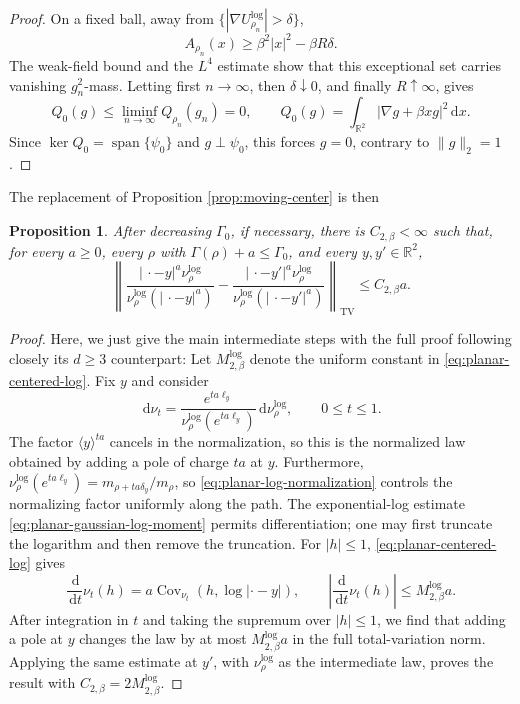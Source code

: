 \documentclass[12pt,reqno,letterpaper]{amsart}
\newtheorem{proposition}[theorem]{Proposition}
\theoremstyle{definition}
\theoremstyle{remark}
\numberwithin{equation}{section}
\newcommand{\R}{\mathbb R}
\newcommand{\dd}{\,\mathrm d}
\newcommand{\be}{\beta}
\newcommand{\TV}{\mathrm{TV}}
\begin{document}
\begin{appendix}
\begin{proof}
On a fixed ball, away from
\(\{|\nabla U_{\rho_n}^{\log}|>\delta\}\),
\[
 A_{\rho_n}(x)
 \ge\be^2|x|^2-\be R\delta.
\]
The weak-field bound and the \(L^4\) estimate show that this exceptional set
carries vanishing \(g_n^2\)-mass.  Letting first \(n\to\infty\), then
\(\delta\downarrow0\), and finally \(R\uparrow\infty\), gives
\[
 Q_0(g)\le\liminf_{n\to\infty}Q_{\rho_n}(g_n)=0,
 \qquad
 Q_0(g)=\int_{\R^2}|\nabla g+\be xg|^2\dd x.
\]
Since \(\ker Q_0=\operatorname{span}\{\psi_0\}\) and
\(g\perp\psi_0\), this forces \(g=0\), contrary to \(\|g\|_2=1\).
\end{proof}
The replacement of Proposition \ref{prop:moving-center} is then
\begin{proposition}
\label{prop:planar-moving-center}
After decreasing \(\Gamma_0\), if necessary, there is
\(C_{2,\be}<\infty\) such that, for every \(a\ge0\), every \(\rho\) with
\(\Gamma(\rho)+a\le\Gamma_0\), and every \(y,y'\in\R^2\),
\begin{equation}\label{eq:planar-moving-input}
 \left\|
 \frac{|\,\cdot-y|^a\nu_\rho^{\log}}
      {\nu_\rho^{\log}(|\,\cdot-y|^a)}
 -
 \frac{|\,\cdot-y'|^a\nu_\rho^{\log}}
      {\nu_\rho^{\log}(|\,\cdot-y'|^a)}
 \right\|_{\TV}
 \le C_{2,\be}a.
\end{equation}
\end{proposition}

\begin{proof}
Here, we just give the main intermediate steps with the full proof following closely its $d\ge 3$ counterpart:
Let \(M_{2,\be}^{\log}\) denote the uniform constant in
\eqref{eq:planar-centered-log}.  Fix \(y\) and consider
\[
 \dd\nu_t
 =\frac{e^{ta\ell_y}}{\nu_\rho^{\log}(e^{ta\ell_y})}
 \dd\nu_\rho^{\log},
 \qquad 0\le t\le1.
\]
The factor \(\langle y\rangle^{ta}\) cancels in the normalization, so this is
the normalized law obtained by adding a pole of charge \(ta\) at \(y\).
Furthermore,
\(\nu_\rho^{\log}(e^{ta\ell_y})
=m_{\rho+ta\delta_y}/m_\rho\), so
\eqref{eq:planar-log-normalization} controls the normalizing factor uniformly
along the path.  The exponential-log estimate
\eqref{eq:planar-gaussian-log-moment} permits differentiation; one may first
truncate the logarithm and then remove the truncation.  For \(|h|\le1\),
\eqref{eq:planar-centered-log} gives
\[
 \frac{\dd}{\dd t}\nu_t(h)
 =a\operatorname{Cov}_{\nu_t}(h,\log|\cdot-y|),
 \qquad
 \left|\frac{\dd}{\dd t}\nu_t(h)\right|
 \le M_{2,\be}^{\log}a.
\]
After integration in \(t\) and taking the supremum over \(|h|\le1\), we find
that adding a pole at \(y\) changes the law by at most
\(M_{2,\be}^{\log}a\) in the full total-variation norm.  Applying the same
estimate at \(y'\), with \(\nu_\rho^{\log}\) as the intermediate law, proves
the result with \(C_{2,\be}=2M_{2,\be}^{\log}\).
\end{proof}


\end{appendix}
\end{document}
